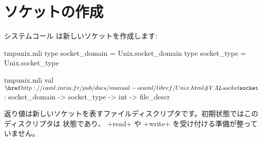 %
\section{ソケットの作成}

システムコール  は新しいソケットを作成します:
%
\begin{codefile}{tmpunix.mli}
type socket_domain = Unix.socket_domain
type socket_type = Unix.socket_type
\end{codefile}
%
\begin{listingcodefile}{tmpunix.mli}
val $\libvalue{Unix}{socket}$ : socket_domain -> socket_type -> int -> file_descr
\end{listingcodefile}
%
返り値は新しいソケットを表すファイルディスクリプタです。初期状態ではこのディスクリプタは  状態であり、 \ml+read+ や \ml+write+ を受け付ける準備が整っていません。

